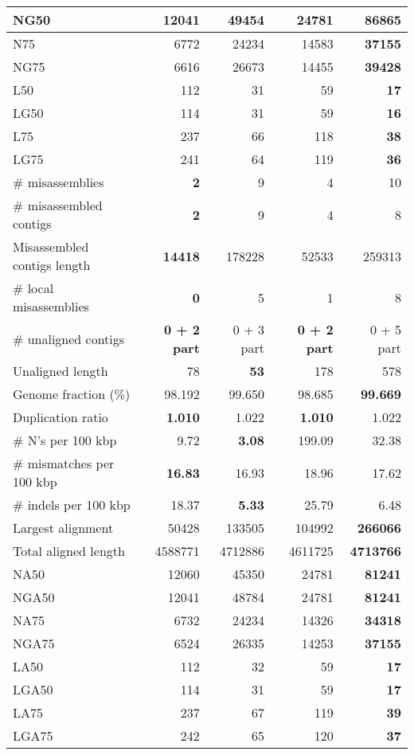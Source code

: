 \documentclass[12pt,a4paper]{article}
\begin{document}
\begin{table}[ht]
\begin{center}
\begin{tabular}{|l*{4}{|r}|}
NG50 & 12041 & 49454 & 24781 & {\bf 86865} \\ \hline
N75 & 6772 & 24234 & 14583 & {\bf 37155} \\ \hline
NG75 & 6616 & 26673 & 14455 & {\bf 39428} \\ \hline
L50 & 112 & 31 & 59 & {\bf 17} \\ \hline
LG50 & 114 & 31 & 59 & {\bf 16} \\ \hline
L75 & 237 & 66 & 118 & {\bf 38} \\ \hline
LG75 & 241 & 64 & 119 & {\bf 36} \\ \hline
\# misassemblies & {\bf 2} & 9 & 4 & 10 \\ \hline
\# misassembled contigs & {\bf 2} & 9 & 4 & 8 \\ \hline
Misassembled contigs length & {\bf 14418} & 178228 & 52533 & 259313 \\ \hline
\# local misassemblies & {\bf 0} & 5 & 1 & 8 \\ \hline
\# unaligned contigs & {\bf 0 + 2 part} & 0 + 3 part & {\bf 0 + 2 part} & 0 + 5 part \\ \hline
Unaligned length & 78 & {\bf 53} & 178 & 578 \\ \hline
Genome fraction (\%) & 98.192 & 99.650 & 98.685 & {\bf 99.669} \\ \hline
Duplication ratio & {\bf 1.010} & 1.022 & {\bf 1.010} & 1.022 \\ \hline
\# N's per 100 kbp & 9.72 & {\bf 3.08} & 199.09 & 32.38 \\ \hline
\# mismatches per 100 kbp & {\bf 16.83} & 16.93 & 18.96 & 17.62 \\ \hline
\# indels per 100 kbp & 18.37 & {\bf 5.33} & 25.79 & 6.48 \\ \hline
Largest alignment & 50428 & 133505 & 104992 & {\bf 266066} \\ \hline
Total aligned length & 4588771 & 4712886 & 4611725 & {\bf 4713766} \\ \hline
NA50 & 12060 & 45350 & 24781 & {\bf 81241} \\ \hline
NGA50 & 12041 & 48784 & 24781 & {\bf 81241} \\ \hline
NA75 & 6732 & 24234 & 14326 & {\bf 34318} \\ \hline
NGA75 & 6524 & 26335 & 14253 & {\bf 37155} \\ \hline
LA50 & 112 & 32 & 59 & {\bf 17} \\ \hline
LGA50 & 114 & 31 & 59 & {\bf 17} \\ \hline
LA75 & 237 & 67 & 119 & {\bf 39} \\ \hline
LGA75 & 242 & 65 & 120 & {\bf 37} \\ \hline
\end{tabular}
\end{center}
\end{table}
\end{document}
